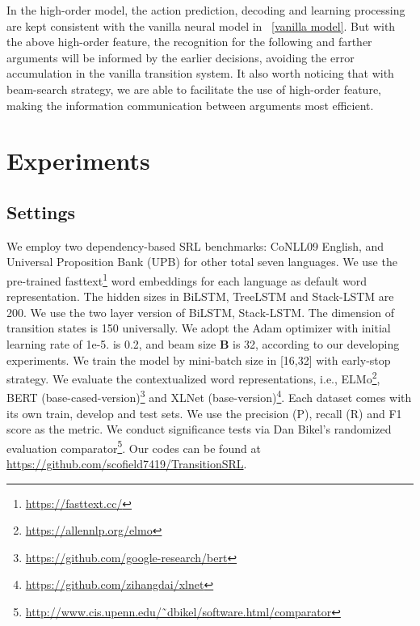 \documentclass[letterpaper]{article} \usepackage{aaai21}  \usepackage{times}  \usepackage{helvet} \usepackage{courier}  \usepackage[hyphens]{url}  \usepackage{graphicx} \urlstyle{rm} \def\UrlFont{\rm}  \usepackage{natbib}  \usepackage{caption}
\begin{document}
\begin{CJK}{UTF8}{gbsn}
In the high-order model, the action prediction, decoding and learning processing are kept consistent with the vanilla neural model in ~\ref{vanilla model}.
But with the above high-order feature,
the recognition for the following and farther arguments will be informed by the earlier decisions, avoiding the error accumulation in the vanilla transition system.
It also worth noticing that with beam-search strategy, we are able to facilitate the use of high-order feature, making the information communication between arguments most efficient.



































\section{Experiments}



\subsection{Settings}

We employ two dependency-based SRL benchmarks: CoNLL09 English, and Universal Proposition Bank (UPB) for other total seven languages.
We use the pre-trained fasttext\footnote{\url{https://fasttext.cc/}} word embeddings for each language as default word representation.
The hidden sizes in BiLSTM, TreeLSTM and Stack-LSTM are 200.
We use the two layer version of BiLSTM, Stack-LSTM.
The dimension of transition states is 150 universally.
We adopt the Adam optimizer with initial learning rate of 1e-5.
 is 0.2, and beam size \textbf{B} is 32, according to our developing experiments.
We train the model by mini-batch size in [16,32] with early-stop strategy.
We evaluate the contextualized word representations, i.e., ELMo\footnote{\url{https://allennlp.org/elmo}}, BERT (base-cased-version)\footnote{\url{https://github.com/google-research/bert}} and XLNet (base-version)\footnote{\url{https://github.com/zihangdai/xlnet}}.
Each dataset comes with its own train, develop and test sets.
We use the precision (P), recall (R) and F1 score as the metric.
We conduct significance tests via Dan Bikel’s randomized evaluation comparator\footnote{\url{http://www.cis.upenn.edu/˜dbikel/software.html/comparator}}.
Our codes can be found at \url{https://github.com/scofield7419/TransitionSRL}.







\end{CJK}
\end{document}
